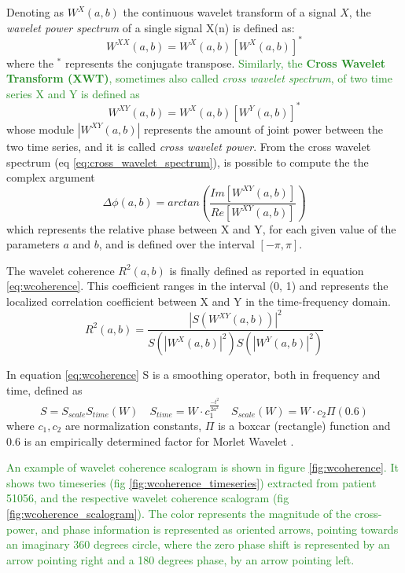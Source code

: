 \documentclass[11pt]{report}
\begin{document}
Denoting as $W^{X}(a, b)$ the continuous wavelet transform of a signal $X$, the \emph{wavelet power spectrum} of a single signal X(n) is defined as:
\begin{equation}
W^{XX}(a, b) = W^X(a, b) \left[W^X(a, b)\right]^{\ast}
\end{equation}
where the $^{\ast}$ represents the conjugate transpose.
\textcolor{ForestGreen}{Similarly, the \textbf{Cross Wavelet Transform (XWT)}, sometimes also called \emph{cross wavelet spectrum}, of two time series X and Y is defined as}
\begin{equation}\label{eq:cross_wavelet_spectrum}
W^{XY}(a, b) = W^X(a, b)[W^Y(a, b)]^\ast
\end{equation}
whose module $|W^{XY}(a, b)|$ represents the amount of joint power between the two time series, and it is called \emph{cross wavelet power}.
From the cross wavelet spectrum (eq \ref{eq:cross_wavelet_spectrum}), is possible to compute the the complex argument
\begin{equation}\label{eq:wavelet_phase}
\Delta \phi (a, b) = arctan\left(\frac{Im\left[ W^{XY}(a, b)\right]}{Re\left[ W^{XY}(a, b)\right]} \right)
\end{equation}
which represents the relative phase between X and Y, for each given value of the parameters $a$ and $b$, and is defined over the interval $[-\pi, \pi]$.

The wavelet coherence $R^2(a, b)$ is finally defined as reported in equation \ref{eq:wcoherence}. This coefficient ranges in the interval (0, 1) and represents the localized correlation coefficient between X and Y in the time-frequency domain.
\begin{equation}\label{eq:wcoherence}
R^2(a, b) = \frac{|S(W^{XY}(a,b))|^2}{S(|W^X(a,b)|^2) S(|W^Y(a,b)|^2)}
\end{equation}

In equation \ref{eq:wcoherence} S is a smoothing operator, both in frequency and time, defined as \cite{torrence-1999} \cite{grinsted-2004}
\[
S = S_{scale}S_{time}(W) \quad S_{time} = W\cdot c_1 ^{\frac{-t^2}{2a^2}} \quad S_{scale}(W) = W\cdot c_2 \Pi(0.6)
\]
where $c_1, c_2$ are normalization constants, $\Pi$ is a boxcar (rectangle) function and 0.6 is an empirically determined factor for Morlet Wavelet \cite{torrence-1998}.

\textcolor{ForestGreen}{
An example of wavelet coherence scalogram is shown in figure \ref{fig:wcoherence}.
It shows two timeseries (fig \ref{fig:wcoherence_timeseries}) extracted from patient 51056, and the respective wavelet coherence scalogram (fig \ref{fig:wcoherence_scalogram}).
The color represents the magnitude of the cross-power, and phase information is represented as oriented arrows, pointing towards an imaginary 360 degrees circle, where the zero phase shift is represented by an arrow pointing right and a 180 degrees phase, by an arrow pointing left.
}
\end{document}
